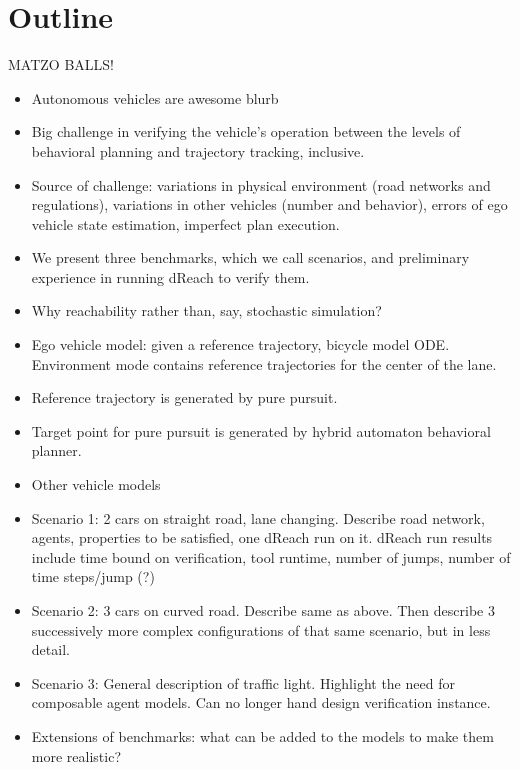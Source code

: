\section{Outline}
{\large MATZO BALLS!}
\begin{itemize}
\item Autonomous vehicles are awesome blurb 

\item Big challenge in verifying the vehicle's operation between the levels of behavioral planning and trajectory tracking, inclusive. 
\item Source of challenge: variations in physical environment (road networks and regulations), variations in other vehicles (number and behavior), errors of ego vehicle state estimation, imperfect plan execution.
\item We present three benchmarks, which we call scenarios, and preliminary experience in running dReach to verify them.
\item Why reachability rather than, say, stochastic simulation?
\item Ego vehicle model: given a reference trajectory, bicycle model ODE. Environment mode contains reference trajectories for the center of the lane. 
\item Reference trajectory is generated by pure pursuit. 
\item Target point for pure pursuit is generated by hybrid automaton behavioral planner.
\item Other vehicle models
\item Scenario 1: 2 cars on straight road, lane changing.
Describe road network, agents, properties to be satisfied, one dReach run on it.
dReach run results include time bound on verification, tool runtime, number of jumps, number of time steps/jump (?)
\item Scenario 2: 3 cars on curved road. 
Describe same as above.
Then describe 3 successively more complex configurations of that same scenario, but in less detail.
\item Scenario 3: General description of traffic light. Highlight the need for composable agent models. Can no longer hand design verification instance. 
\item Extensions of benchmarks: what can be added to the models to make them more realistic?
\end{itemize}

